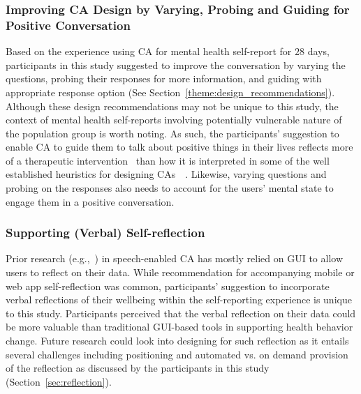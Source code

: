        \subsubsection{Improving \ac{CA} Design by Varying, Probing and Guiding for Positive Conversation}
            Based on the experience using \ac{CA} for mental health self-report for $28$ days, participants in this study suggested to improve the conversation by varying the questions, probing their responses for more information, and guiding with appropriate response option (See Section~\ref{theme:design_recommendations}). Although these design recommendations may not be unique to this study, the context of mental health self-reports involving potentially vulnerable nature of the population group is worth noting. As such, the participants' suggestion to enable \ac{CA} to guide them to talk about positive things in their lives reflects more of a therapeutic intervention~\cite{tindall2017behavioural} than how it is interpreted in some of the well established heuristics for designing \ac{CA}s~\cite[Table 2. G10]{murad2019revolution}~\cite[Table 8]{langevin2021heuristic}. Likewise, varying questions and probing on the responses also needs to account for the users' mental state to engage them in a positive conversation.
            
        \subsubsection{Supporting (Verbal) Self-reflection}
            Prior research (e.g.,~\cite{kocielnik2018designing, myers2018patterns}) in speech-enabled \ac{CA} has mostly relied on \ac{GUI} to allow users to reflect on their data. While recommendation for accompanying mobile or web app self-reflection was common, participants' suggestion to incorporate verbal reflections of their wellbeing within the self-reporting experience is unique to this study. Participants perceived that the verbal reflection on their data could be more valuable than traditional \ac{GUI}-based tools in supporting health behavior change. Future research could look into designing for such reflection as it entails several challenges including positioning and automated vs. on demand provision of the reflection as discussed by the participants in this study (Section~\ref{sec:reflection}).
        
